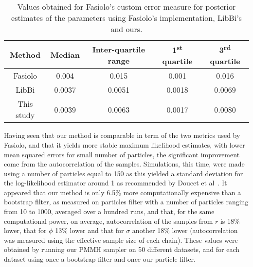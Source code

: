\documentclass[12pt]{article}
\newcommand{\ra}[1]{\renewcommand{\arraystretch}{#1}}
\begin{document}
	\begin{table}[htb]
		\centering
		\vspace{10mm}
		\ra{1.3}
		\begin{tabular}{@{}ccccc@{}} \toprule
			Method & Median &  Inter-quartile range & 1\textsuperscript{st} quartile & 3\textsuperscript{rd} quartile \\ \midrule 
			Fasiolo & 0.004 & 0.015 & 0.001 & 0.016\\ 
			LibBi & 0.0037 & 0.0051 & 0.0018 & 0.0069 \\ 
			This study & 0.0039 &  0.0063 & 0.0017 & 0.0080\\ \bottomrule
		\end{tabular}
		\caption[Comparison between Fasiolo's custom error measure for posterior estimates of the parameters obtain in this study and in Fasiolo's ]{Values obtained for Fasiolo's custom error measure for posterior estimates of the parameters using Fasiolo's implementation, LibBi's and ours.}
		\label{table:metric}
	\end{table}
	
\clearpage
	Having seen that our method is comparable in term of the two metrics used by Fasiolo, and that it yields more stable maximum likelihood estimates, with lower mean squared errors for small number of particles, the significant improvement come from the autocorrelation of the samples. Simulations, this time, were made using a number of particles equal to 150 as this yielded a standard deviation for the log-likelihood estimator around 1 as recommended by Doucet et al~\cite{doucet2015efficient}. It appeared that our method is only 6.5\% more computationally expensive than a bootstrap filter, as measured on particles filter with a number of particles ranging from 10 to 1000, averaged over a hundred runs, and that, for the same computational power, on average, autocorrelation of the samples from $r$ is 18\% lower, that for $\phi$ 13\% lower and that for $\sigma$ another 18\% lower (autocorrelation was measured using the effective sample size of each chain). These values were obtained by running our PMMH sampler on 50 different datasets, and for each dataset using once a bootstrap filter and once our particle filter.
	
\end{document}
